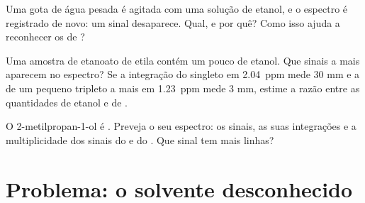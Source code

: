 \begin{exercise}[$\star\star\star$]\label{exo:g12:proton-nmr:13}
Uma gota de água pesada  é agitada com uma solução de etanol, e
o espectro é registrado de novo: um sinal desaparece. Qual, e por quê?
Como isso ajuda a reconhecer os  de ?
\end{exercise}

\begin{exercise}[$\star\star\star$]\label{exo:g12:proton-nmr:14}
Uma amostra de etanoato de etila contém um pouco de etanol. Que sinais a
mais aparecem no espectro? Se a integração do singleto em
\qty{2.04}{ppm} mede 30 mm e a de um pequeno tripleto a mais em
\qty{1.23}{ppm} mede 3 mm, estime a razão entre as quantidades de etanol
e de .
\end{exercise}

\begin{exercise}[$\star\star\star$]\label{exo:g12:proton-nmr:15}
O 2-metilpropan-1-ol é . Preveja o seu espectro: os
sinais, as suas integrações e a multiplicidade dos sinais do  e
do . Que sinal tem mais linhas?
\end{exercise}

\section{Problema: o solvente desconhecido}

